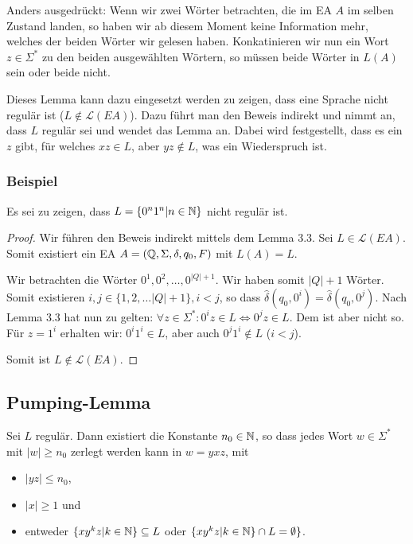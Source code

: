 Anders ausgedrückt: Wenn wir zwei Wörter betrachten, die im EA $A$ im selben Zustand landen, so haben wir ab diesem Moment keine Information mehr, welches der beiden Wörter wir gelesen haben. Konkatinieren wir nun ein Wort $z \in \Sigma^*$ zu den beiden ausgewählten Wörtern, so müssen beide Wörter in $L(A)$ sein oder beide nicht.

Dieses Lemma kann dazu eingesetzt werden zu zeigen, dass eine Sprache nicht regulär ist ($L \not\in \mathcal{L}(EA)$). Dazu führt man den Beweis indirekt und nimmt an, dass $L$ regulär sei und wendet das Lemma an. Dabei wird festgestellt, dass es ein $z$ gibt, für welches $xz \in L$, aber $yz \not\in L$, was ein Wiederspruch ist.

\subsubsection{Beispiel}
Es sei zu zeigen, dass $L = \{0^n1^n | n \in \mathbb{N}\}$ nicht regulär ist.
\begin{proof}
Wir führen den Beweis indirekt mittels dem Lemma 3.3. Sei $L \in \mathcal{L}(EA)$. Somit existiert ein EA $A = (\mathbb{Q}, \Sigma, \delta, q_0, F)$ mit $L(A) = L$.

Wir betrachten die Wörter $0^1, 0^2, \ldots, 0^{|Q|+1}$. Wir haben somit $|Q| + 1$ Wörter. Somit existieren $i, j \in \{1, 2, \ldots |Q| + 1\}, i < j$, so dass $\hat\delta(q_0, 0^i) = \hat\delta(q_0, 0^j)$. Nach Lemma 3.3 hat nun zu gelten: $\forall z \in \Sigma^*: 0^i z \in L \Leftrightarrow 0^j z \in L$. Dem ist aber nicht so. Für $z = 1^i$ erhalten wir: $0^i 1^i \in L$, aber auch $0^j 1^i \not\in L$ ($i < j$).

Somit ist $L \not\in \mathcal{L}(EA)$.
\end{proof}

\subsection{Pumping-Lemma}
\begin{lemma}
Sei $L$ regulär. Dann existiert die Konstante $n_0 \in \mathbb{N}$, so dass jedes Wort $w \in \Sigma^*$ mit $|w| \geq n_0$ zerlegt werden kann in $w = y x z$, mit
\begin{itemize}
  \item $|yz| \leq n_0$,
  \item $|x| \geq 1$ und
  \item entweder $\{xy^kz | k \in \mathbb{N}\} \subseteq L$ oder $\{xy^kz | k \in \mathbb{N} \} \cap L = \emptyset\}$.
\end{itemize}

\end{lemma}

